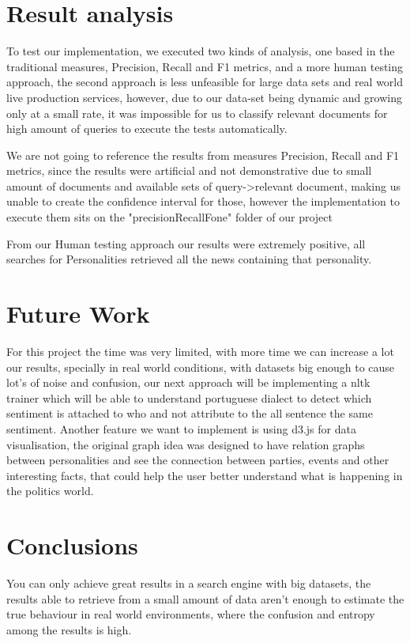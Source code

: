 \documentclass{acm_proc_article-sp}
\begin{document}
\section{Result analysis}
To test our implementation, we executed two kinds of analysis, one based in the traditional measures, Precision, Recall and F1 metrics, and a more human testing approach, the second approach is less unfeasible for large data sets and real world live production services, however, due to our data-set being dynamic and growing only at a small rate, it was impossible for us to classify relevant documents for high amount of queries to execute the tests automatically.

We are not going to reference the results from measures Precision, Recall and F1 metrics, since the results were artificial and not demonstrative due to small amount of documents and available sets of query->relevant document, making us unable to create the confidence interval for those, however the implementation to execute them sits on the "precisionRecallFone" folder of our project

From our Human testing approach our results were extremely positive, all searches for Personalities retrieved all the news containing that personality.

\section{Future Work}
For this project the time was very limited, with more time we can increase a lot our results, specially in real world conditions, with datasets big enough to cause lot's of noise and confusion, our next approach will be implementing a nltk trainer which will be able to understand portuguese dialect to detect which sentiment is attached to who and not attribute to the all sentence the same sentiment.
Another feature we want to implement is using d3.js for data visualisation, the original graph idea was designed to have relation graphs between personalities and see the connection between parties, events and other interesting facts, that could help the user better understand what is happening in the politics world.

\section{Conclusions}

You can only achieve great results in a search engine with big datasets, the results able to retrieve from a small amount of data aren't enough to estimate the true behaviour in real world environments, where the confusion and entropy among the results is high.
\end{document}
